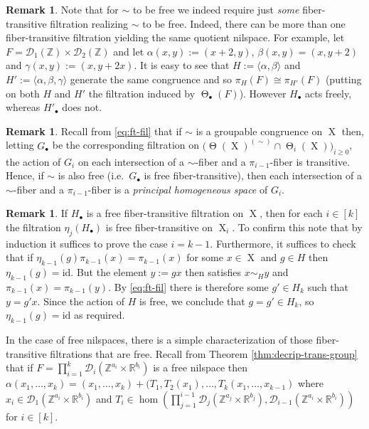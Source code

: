 \documentclass[a4paper,12pt,reqno]{amsart}
\theoremstyle{definition}
\newtheorem{remark}[theorem]{Remark}
\newcommand{\mc}{\mathcal}
\newcommand{\mb}{\mathbb}
\newcommand{\id}{\mathrm{id}}
\DeclareMathOperator{\tran}{\Theta}
\DeclareMathOperator{\ns}{X}
\begin{document}
\begin{remark}\label{rem:different-filtr}
Note that for $\sim$ to be free we indeed require just \emph{some} fiber-transitive filtration realizing $\sim$ to be free. Indeed, there can be more than one fiber-transitive filtration yielding the same quotient nilspace. For example, let $F=\mc{D}_1(\mb{Z})\times \mc{D}_2(\mb{Z})$ and let $\alpha(x,y):=(x+2,y)$, $\beta(x,y)=(x,y+2)$ and $\gamma(x,y):=(x,y+2x)$. It is easy to see that $H:=\langle \alpha,\beta\rangle$ and $H':=\langle \alpha,\beta,\gamma\rangle$ generate the same congruence and so $\pi_H(F) \cong \pi_{H'}(F)$ (putting on both $H$ and $H'$ the filtration induced by $\tran_\bullet (F)$). However  $H_\bullet$ acts freely, whereas $H'_\bullet$ does not.
\end{remark}

\begin{remark}
Recall from \eqref{eq:ft-fil} that if $\sim$ is a groupable congruence on $\ns$ then, letting $G_\bullet$ be the corresponding filtration on $\big(\tran(\ns)^{(\sim)}\cap \tran_i(\ns)\big)_{i\geq 0}$, the action of $G_i$ on each intersection of a $\sim$-fiber and a $\pi_{i-1}$-fiber is transitive. Hence, if $\sim$ is also free (i.e.\ $G_\bullet$ is free fiber-transitive), then each intersection of a $\sim$-fiber and a $\pi_{i-1}$-fiber is a \emph{principal homogeneous space} of $G_i$.
\end{remark}

\begin{remark}
If $H_\bullet$ is a free fiber-transitive filtration on $\ns$, then for each $i\in[k]$ the filtration  $\eta_j(H_\bullet)$ is free fiber-transitive on $\ns_i$. To confirm this note that by induction it suffices to prove the case $i=k-1$. Furthermore, it suffices to check that if $\eta_{k-1}(g)\pi_{k-1}(x)=\pi_{k-1}(x)$ for some $x\in \ns$ and $g\in H$ then $\eta_{k-1}(g)=\id$. But the element $y:=gx$ then satisfies $x\sim_H y$ and $\pi_{k-1}(x)=\pi_{k-1}(y)$. By \eqref{eq:ft-fil} there is therefore some $g'\in H_k$ such that $y=g'x$. Since the action of $H$ is free, we conclude that $g=g'\in H_k$, so $\eta_{k-1}(g)=\id$ as required.
\end{remark}
\noindent In the case of free nilspaces, there is a simple characterization of those fiber-transitive filtrations that are free. Recall from Theorem \ref{thm:decrip-trans-group} that if $F=\prod_{i=1}^k\mc{D}_i(\mb{Z}^{a_i}\times \mb{R}^{b_i})$ is a free nilspace then $\alpha(x_1,\ldots,x_k)=(x_1,\ldots,x_k)+(T_1,T_2(x_1),\ldots,T_k(x_1,\ldots,x_{k-1})$ where $x_i\in \mc{D}_1(\mb{Z}^{a_i}\times \mb{R}^{b_i})$ and $T_i\in \hom(\prod_{j=1}^{i-1}\mc{D}_j(\mb{Z}^{a_j}\times \mb{R}^{b_j}), \mc{D}_{i-1}(\mb{Z}^{a_i}\times \mb{R}^{b_i}))$ for $i\in[k]$.
\end{document}
